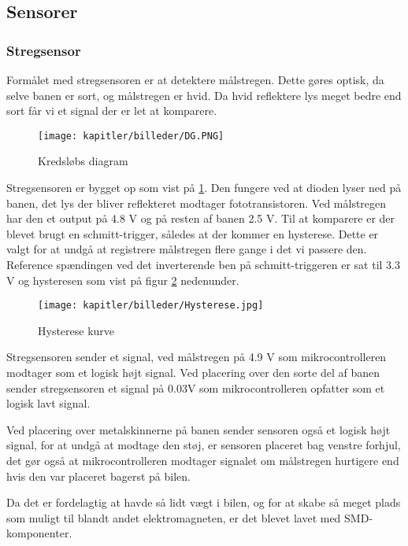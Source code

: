 
\subsection{Sensorer}


\subsubsection{Stregsensor}
Formålet med stregsensoren er at detektere målstregen. Dette gøres optisk, da selve banen er sort, og målstregen er hvid. Da hvid reflektere lys meget bedre end sort får vi et signal der er let at komparere.
\begin{figure}[ht]
	\centering
	\texttt{[image: kapitler/billeder/DG.PNG]}
	\caption{Kredsløbs diagram}
	\label{fig:DG}
\end{figure}
Stregsensoren er bygget op som vist på \ref{fig:DG}. Den fungere ved at dioden lyser ned på banen, det lys der bliver reflekteret modtager fototransistoren. Ved målstregen har den et output på 4.8 V og på resten af banen 2.5 V. Til at komparere er der blevet brugt en schmitt-trigger, således at der kommer en hysterese. Dette er valgt for at undgå at registrere målstregen flere gange i det vi passere den. Reference spændingen ved det inverterende ben på schmitt-triggeren er sat til 3.3 V og hysteresen som vist på figur \ref{fig:hys} nedenunder.

\begin{figure}[ht]
	\centering
	\texttt{[image: kapitler/billeder/Hysterese.jpg]}
	\caption{Hysterese kurve}
	\label{fig:hys}
\end{figure}

Stregsensoren sender et signal, ved målstregen på 4.9 V som  mikrocontrolleren modtager som et logisk højt signal. Ved placering over den sorte del af banen sender stregsensoren et signal på 0.03V som mikrocontrolleren opfatter som et logisk lavt signal.

Ved placering over metalskinnerne på banen sender sensoren også et logisk højt signal, for at undgå at modtage den støj, er sensoren placeret bag venstre forhjul, det gør også at mikrocontrolleren modtager signalet om målstregen hurtigere end hvis den var placeret bagerst på bilen.

Da det er fordelagtig at havde så lidt vægt i bilen, og for at skabe så meget plads som muligt til blandt andet elektromagneten, er det blevet lavet med SMD-komponenter.


